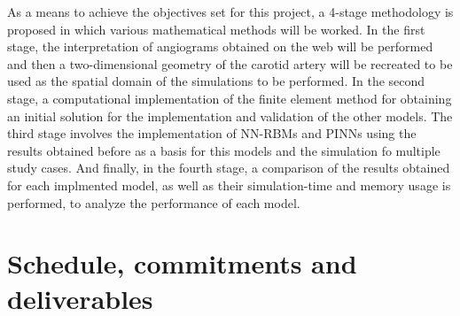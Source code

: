 \documentclass[12pt,letterpaper]{article}
\begin{document}
As a means to achieve the objectives set for this project, a 4-stage methodology is proposed in which
various mathematical methods will be worked. In the first stage, the interpretation of angiograms
obtained on the web will be performed and then a two-dimensional geometry of the carotid artery will
be recreated to be used as the spatial domain of the simulations to be performed. In the second stage, 
a computational implementation of the finite element method for obtaining an initial solution for the 
implementation and validation of the other models. The third stage involves the implementation of NN-RBMs and 
PINNs using the results obtained before as a basis for this models and the simulation fo multiple study 
cases. And finally, in the fourth stage, a comparison of the results obtained for each implmented model, as well as their simulation-time and memory usage is performed, to analyze the performance of each model.\\





\section{Schedule, commitments and deliverables}

\end{document}
